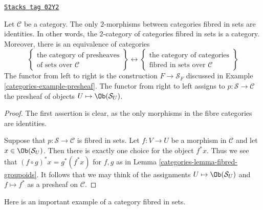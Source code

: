 \begin{lemma}
\label{categories-lemma-2-category-fibred-sets}
\href{https://stacks.math.columbia.edu/tag/02Y2}{\texttt{Stacks tag 02Y2}}


Let $\mathcal{C}$ be a category.
The only $2$-morphisms between categories fibred in sets are identities.
In other words, the $2$-category of categories fibred in sets is a category.
Moreover, there is an equivalence of categories
$$
\left\{
\begin{matrix}
\text{the category of presheaves}\\
\text{of sets over }\mathcal{C}
\end{matrix}
\right\}
\leftrightarrow
\left\{
\begin{matrix}
\text{the category of categories}\\
\text{fibred in sets over }\mathcal{C}
\end{matrix}
\right\}
$$
The functor from left to right is the construction
$F \to \mathcal{S}_F$ discussed in
Example \ref{categories-example-presheaf}.
The functor from right to left assigns to $p : \mathcal{S} \to \mathcal{C}$
the presheaf of objects $U \mapsto \Ob(\mathcal{S}_U)$.
\end{lemma}

\begin{proof}

The first assertion is clear, as the only morphisms in the fibre
categories are identities.

\medskip\noindent
Suppose that $p :
\mathcal{S} \to \mathcal{C}$ is fibred in sets. Let $f : V \to U$
be a morphism in $\mathcal{C}$ and let $x \in \Ob(\mathcal{S}_U)$.
Then there is exactly one choice for the object $f^\ast x$. Thus we see that
$(f \circ g)^\ast x = g^\ast(f^\ast x)$ for $f, g$ as in Lemma
\ref{categories-lemma-fibred-groupoids}. It follows that we may think of the
assignments $U \mapsto \Ob(\mathcal{S}_U)$ and $f \mapsto f^\ast$
as a presheaf on $\mathcal{C}$.
\end{proof}

Here is an important example of a category fibred in sets.

